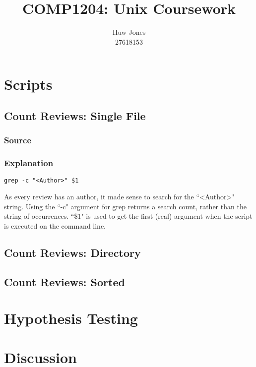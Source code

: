 \documentclass[12pt,a4paper]{article}
\author{Huw Jones \\27618153}
\title{COMP1204: Unix Coursework}
\begin{document}
\maketitle
\newpage

\section{Scripts}
\subsection{Count Reviews: Single File}
\subsubsection{Source}

\subsubsection{Explanation}
\begin{lstlisting}
grep -c "<Author>" $1
\end{lstlisting}
As every review has an author, it made sense to search for the ``\textless Author\textgreater" string.
Using the ``-c" argument for grep returns a search count, rather than the string of occurrences.
``\$1" is used to get the first (real) argument when the script is executed on the command line.

\subsection{Count Reviews: Directory}


\subsection{Count Reviews: Sorted}


\section{Hypothesis Testing}

\section{Discussion}
\end{document}
